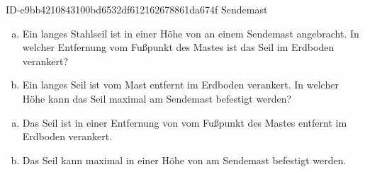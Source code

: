 \begin{exercise}
      {ID-e9bb4210843100bd6532df612162678861da674f}
      {Sendemast}
  \ifproblem\problem
    \begin{enumerate}[a)]
      \item Ein  langes Stahlseil ist in einer Höhe von 
            an einem Sendemast angebracht. In welcher Entfernung vom Fußpunkt des
            Mastes ist das Seil im Erdboden verankert?
      \item Ein  langes Seil ist  vom Mast entfernt im
            Erdboden verankert. In welcher Höhe kann das Seil maximal am Sendemast
            befestigt werden?
    \end{enumerate}
  \fi
  \ifoutcome\outcome
    \begin{enumerate}[a)]
      \item Das Seil ist in einer Entfernung von  vom Fußpunkt des
            Mastes entfernt im Erdboden verankert.
      \item Das Seil kann maximal in einer Höhe von  am Sendemast
            befestigt werden.
    \end{enumerate}
  \fi
\end{exercise}
